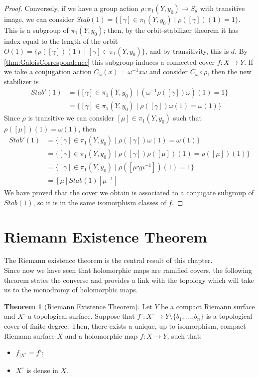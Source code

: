 \documentclass[12pt,a4paper,openright,twoside]{report}
\theoremstyle{definition} %
\newtheorem{theorem}{Theorem}[chapter]
\begin{document}
\begin{proof}
    Conversely, if we have a group action \(\rho : \pi_1(Y,y_0) \to S_d\) with transitive image, we can consider \(Stab(1) = \{ [\gamma] \in \pi_1(Y, y_0) \mid \rho([\gamma])(1)=1\} \). This is a subgroup of \(\pi_1(Y,y_0)\); then, by the orbit-stabilizer theorem it has index equal to the length of the orbit \(O(1) = \{\rho([\gamma])(1) \mid [\gamma] \in \pi_1(Y, y_0)\}\), and by transitivity, this is \(d\). By \ref{thm:GaloisCorrespondence} this subgroup induces a connected cover \(f : X \to Y\). If we take a conjugation action \(C_{\omega}(x) = \omega^{-1}x\omega\) and consider \(C_{\omega} \circ \rho\), then the new stabilizer is
    \begin{align*}
    Stab'(1) &= \{ [\gamma] \in \pi_1(Y, y_0) \mid (\omega^{-1}\rho([\gamma])\omega)(1)=1\}\\
    & = \{ [\gamma] \in \pi_1(Y, y_0) \mid \rho([\gamma])\omega(1)=\omega(1)\}
    \end{align*}
    Since \(\rho\) is transitive we can consider \([\mu] \in \pi_1(Y,y_0)\) such that \(\rho([\mu])(1) = \omega(1)\), then
    \begin{align*}
    Stab'(1) &= \{ [\gamma] \in \pi_1(Y, y_0) \mid \rho([\gamma])\omega(1)=\omega(1)\}\\
    & = \{ [\gamma] \in \pi_1(Y, y_0) \mid \rho([\gamma])\rho([\mu])(1)=\rho([\mu])(1)\}\\
    & = \{ [\gamma] \in \pi_1(Y, y_0) \mid \rho([\mu\gamma\mu^{-1}])(1)=1\}\\
    & = [\mu] Stab(1) [\mu^{-1}]
    \end{align*}
    We have proved that the cover we obtain is associated to a conjugate subgroup of \(Stab(1)\), so it is in the same isomorphism classes of \(f\).
\end{proof}

\section{Riemann Existence Theorem}
The Riemann existence theorem is the central result of this chapter.\\
Since now we have seen that holomorphic maps are ramified covers, the following theorem states the converse and provides a link with the topology which will take us to the monodromy of holomorphic maps. 

\begin{theorem}[Riemann Existence Theorem]
    Let \(Y\) be a compact Riemann surface and \(X^{\circ}\) a topological surface. Suppose that \(f^{\circ} : X^{\circ} \to Y\setminus\{b_1,\dots,b_n\} \) is a topological cover of finite degree.
    Then, there exists a unique, up to isomorphism, compact Riemann surface \(X\) and a holomorphic map \(f: X \to Y\), such that:
    \begin{itemize}
        \item \(f_{|X^{\circ}} = f^{\circ}\);
        \item \( X^{\circ}\) is dense in \(X\).
    \end{itemize}
\end{theorem}
\end{document}
